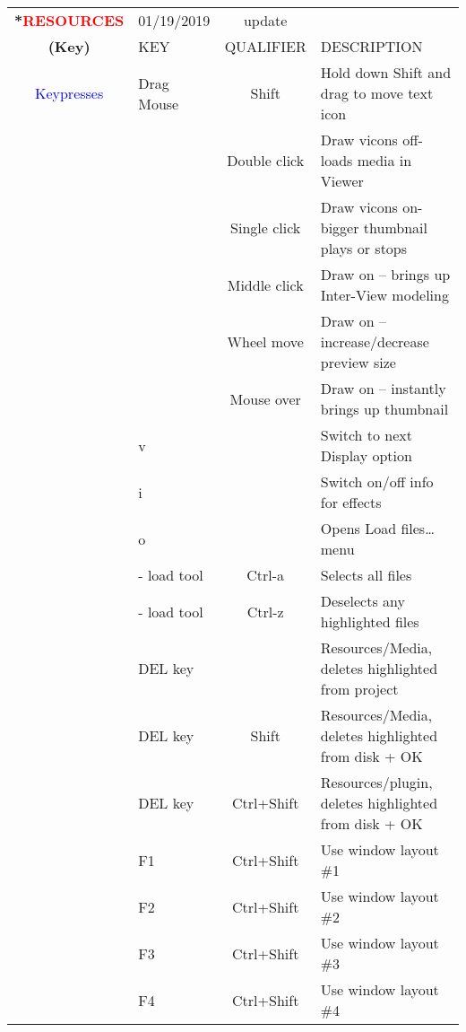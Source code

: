 \begin{center}
    \small 
    \begin{longtable}{ >{\bfseries}c l c p{6cm}}             
        \toprule
        \multirow{2}*{\textcolor{red}{RESOURCES}} & 01/19/2019 & update & \\
        \noalign{\smallskip}
        \cline{2-4}
        \noalign{\smallskip}
        (Key) & KEY & QUALIFIER & DESCRIPTION\\
        \midrule        
        \endhead   
        
        \textcolor{blue}{Keypresses} & Drag Mouse & Shift & Hold down Shift and drag to move text icon \\                
        &  & Double click & Draw vicons off- loads media in Viewer \\        
        &  & Single click & Draw vicons on- bigger thumbnail plays or stops \\        
        &  & Middle click & Draw on -- brings up Inter-View modeling \\        
        &  & Wheel move & Draw on – increase/decrease preview size \\        
        &  & Mouse over & Draw on – instantly brings up thumbnail \\        
        & v &  & Switch to next Display option \\        
        & i &  & Switch on/off info for effects \\        
        & o &  & Opens Load files\dots menu \\        
        & - load tool & Ctrl-a & Selects all files \\        
        & - load tool & Ctrl-z & Deselects any highlighted files \\        
        & DEL key &  & Resources/Media, deletes highlighted from project \\        
        & DEL key & Shift & Resources/Media, deletes highlighted from disk + OK \\        
        & DEL key & Ctrl+Shift & Resources/plugin, deletes highlighted from disk + OK \\
        & F1 & Ctrl+Shift & Use window layout \#1 \\        
        & F2 & Ctrl+Shift & Use window layout \#2 \\        
        & F3 & Ctrl+Shift & Use window layout \#3 \\        
        & F4 & Ctrl+Shift & Use window layout \#4 \\
        
        
        \bottomrule  
    \end{longtable}
\end{center} 

